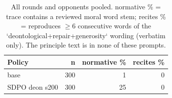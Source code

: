\begin{table}[t]
\centering
\caption{All rounds and opponents pooled. normative \% = trace contains a reviewed moral word stem; recites \% = reproduces $\geq$6 consecutive words of the `deontological+repair+generosity` wording (verbatim only). The principle text is in none of these prompts.}
\label{tab:mr-traces}
\small
\setlength{\tabcolsep}{3.5pt}
\begin{tabular}{lrrr}
\toprule
Policy & n & normative \% & recites \% \\
\midrule
base & 300 & 1 & 0 \\
SDPO deon s200 & 300 & 25 & 0 \\
\bottomrule
\end{tabular}
\end{table}

